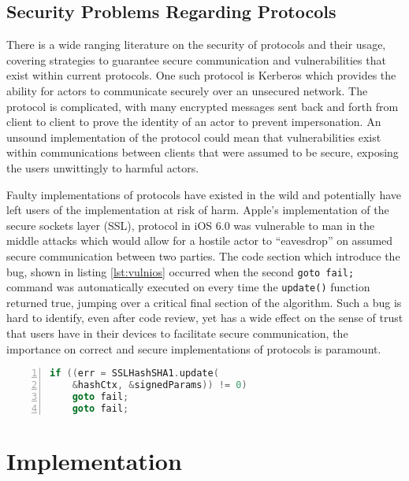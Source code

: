 \documentclass{article}
\begin{document}
	\subsection{Security Problems Regarding Protocols}
	There is a wide ranging literature on the security of protocols and their usage, covering strategies to guarantee secure communication and vulnerabilities that exist within current protocols. One such protocol is Kerberos\cite{neuman1994kerberos} which provides the ability for actors to communicate securely over an unsecured network. The protocol is complicated, with many encrypted messages sent back and forth from client to client to prove the identity of an actor to prevent impersonation. An unsound implementation of the protocol could mean that vulnerabilities exist within communications between clients that were assumed to be secure, exposing the users unwittingly to harmful actors.
	
	Faulty implementations of protocols have existed in the wild and potentially have left users of the implementation at risk of harm. Apple's implementation of the secure sockets layer\cite{elgamal1997secure} (SSL), protocol in iOS 6.0 was vulnerable to man in the middle attacks\cite{bland2014finding} which would allow for a hostile actor to ``eavesdrop'' on assumed secure communication between two parties. The code section which introduce the bug, shown in listing \ref{lst:vulnios} occurred when the second \texttt{goto fail;} command was automatically executed on every time the \texttt{update()} function returned true, jumping over a critical final section of the algorithm. Such a bug is hard to identify, even after code review, yet has a wide effect on the sense of trust that users have in their devices to facilitate secure communication, the importance on correct and secure implementations of protocols is paramount.
	\begin{lstlisting}[label={lst:vulnios}, language=c, frame=single, numbers=left, caption=The vulenarble code section in iOS 6.0's SSL implementation\cite{bland2014finding}]
if ((err = SSLHashSHA1.update(
	&hashCtx, &signedParams)) != 0)
	goto fail;
	goto fail;
	\end{lstlisting}
	\section{Implementation}
\end{document}
